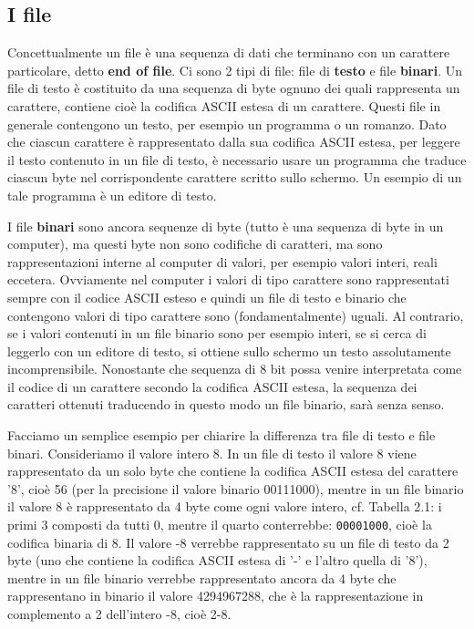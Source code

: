 \subsection{I file}
Concettualmente un file è una sequenza di dati che terminano con un carattere particolare, detto \textbf{end of file}.
Ci sono 2 tipi di file: file di \textbf{testo} e file \textbf{binari}.
Un file di testo è costituito da una sequenza di byte ognuno dei quali rappresenta un carattere, contiene cioè la codifica ASCII estesa di un carattere.
Questi file in generale contengono un testo, per esempio un programma o un romanzo.
Dato che ciascun carattere è rappresentato dalla sua codifica ASCII estesa, per leggere il testo contenuto in un file di testo, è necessario usare un programma che traduce ciascun byte nel corrispondente carattere scritto sullo schermo.
Un esempio di un tale programma è un editore di testo. 

I file \textbf{binari} sono ancora sequenze di byte (tutto è una sequenza di byte in un computer), ma questi byte non sono codifiche di caratteri, ma sono rappresentazioni interne al computer di valori, per esempio valori interi, reali eccetera.
Ovviamente nel computer i valori di tipo carattere sono rappresentati sempre con il codice ASCII esteso e quindi un file di testo e binario che contengono valori di tipo carattere sono (fondamentalmente) uguali.
Al contrario, se i valori contenuti in un file binario sono per esempio interi, se si cerca di leggerlo con un editore di testo, si ottiene sullo schermo un testo assolutamente incomprensibile.
Nonostante che sequenza di 8 bit possa venire interpretata come il codice di un carattere secondo la codifica ASCII estesa, la sequenza dei caratteri ottenuti traducendo in questo modo un file binario, sarà senza senso. 

Facciamo un semplice esempio per chiarire la differenza tra file di testo e file binari.
Consideriamo il valore intero 8.
In un file di testo il valore 8 viene rappresentato da un solo byte che contiene la codifica ASCII estesa del carattere '8', cioè 56 (per la precisione il valore binario 00111000), mentre in un file binario il valore 8 è rappresentato da 4 byte come ogni valore intero, cf. Tabella 2.1: i primi 3 composti da tutti 0, mentre il quarto conterrebbe: \texttt{00001000}, cioè la codifica binaria di 8.
Il valore -8 verrebbe rappresentato su un file di testo da 2 byte (uno che contiene la codifica ASCII estesa di '-' e l'altro quella di '8'), mentre in un file binario verrebbe rappresentato ancora da 4 byte che rappresentano in binario il valore 4294967288, che è la rappresentazione in complemento a 2 dell'intero -8, cioè 2-8.

